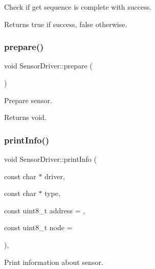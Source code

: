 Check if get sequence is complete with success. 

\begin{DoxyReturn}{Returns}
true if success, false otherwise. 
\end{DoxyReturn}
\mbox{\label{classSensorDriver_a19e0acad6518cf382fe7e71a7b915506}} 
\subsubsection{\texorpdfstring{prepare()}{prepare()}}
{\footnotesize\ttfamily void Sensor\+Driver\+::prepare (\begin{DoxyParamCaption}{ }\end{DoxyParamCaption})\hspace{0.3cm}{\ttfamily [virtual]}}



Prepare sensor. 

\begin{DoxyReturn}{Returns}
void. 
\end{DoxyReturn}
\mbox{\label{classSensorDriver_acaeaeab0b4536073c812bf53582a9e08}} 
\subsubsection{\texorpdfstring{print\+Info()}{printInfo()}}
{\footnotesize\ttfamily void Sensor\+Driver\+::print\+Info (\begin{DoxyParamCaption}\item[{const char $\ast$}]{driver,  }\item[{const char $\ast$}]{type,  }\item[{const uint8\+\_\+t}]{address = {},  }\item[{const uint8\+\_\+t}]{node = {} }\end{DoxyParamCaption})\hspace{0.3cm}{\ttfamily [static]}, {\ttfamily [protected]}}



Print information about sensor. 


